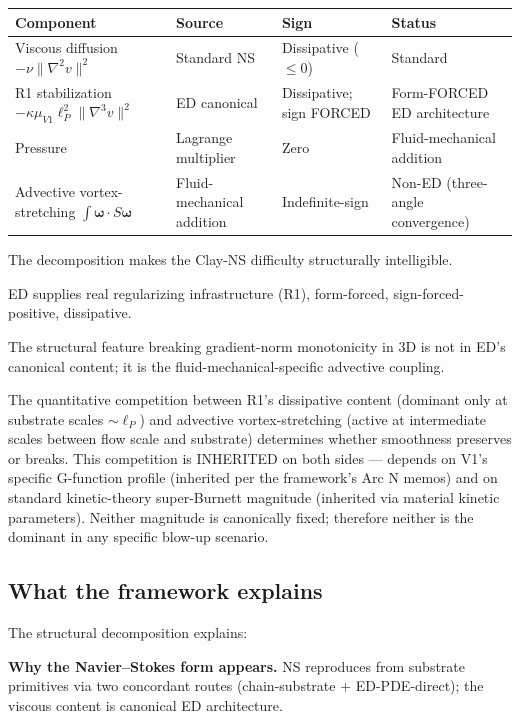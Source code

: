 \documentclass[11pt,a4paper]{article}
\begin{document}
\begin{center}
\small
\begin{tabular}{@{}p{4.2cm}p{2.8cm}p{3.2cm}p{4cm}@{}}
\toprule
Component & Source & Sign & Status \\
\midrule
Viscous diffusion $-\nu\|\nabla^2 v\|^2$ & Standard NS & Dissipative ($\leq 0$) & Standard \\
R1 stabilization $-\kappa\mu_{V1}\ell_P^2\|\nabla^3 v\|^2$ & ED canonical & Dissipative; sign FORCED & Form-FORCED ED architecture \\
Pressure & Lagrange multiplier & Zero & Fluid-mechanical addition \\
Advective vortex-stretching $\int\boldsymbol\omega\cdot S\boldsymbol\omega$ & Fluid-mechanical addition & Indefinite-sign & Non-ED (three-angle convergence) \\
\bottomrule
\end{tabular}
\end{center}

The decomposition makes the Clay-NS difficulty structurally intelligible.

ED supplies real regularizing infrastructure (R1), form-forced, sign-forced-positive, dissipative.

The structural feature breaking gradient-norm monotonicity in 3D is not in ED's canonical content; it is the fluid-mechanical-specific advective coupling.

The quantitative competition between R1's dissipative content (dominant only at substrate scales $\sim \ell_P$) and advective vortex-stretching (active at intermediate scales between flow scale and substrate) determines whether smoothness preserves or breaks. This competition is INHERITED on both sides --- depends on V1's specific G-function profile (inherited per the framework's Arc N memos) and on standard kinetic-theory super-Burnett magnitude (inherited via material kinetic parameters). Neither magnitude is canonically fixed; therefore neither is the dominant in any specific blow-up scenario.

\subsection{What the framework explains}

The structural decomposition explains:

\textbf{Why the Navier--Stokes form appears.} NS reproduces from substrate primitives via two concordant routes (chain-substrate + ED-PDE-direct); the viscous content is canonical ED architecture.
\end{document}
